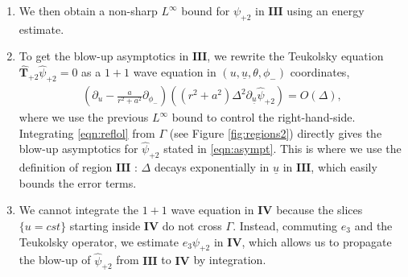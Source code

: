 \documentclass[reqno]{amsart}
\numberwithin{equation}{section}
\newcommand{\teukhat}{\widehat{\teuk}}
\newcommand{\quatre}{\mathbf{IV}}
\newcommand{\ubar}{{\underline{u}}}
\newcommand{\teuk}{\mathbf{T}}
\newcommand{\Psihat}{\widehat{\psi}}
\newcommand{\psihat}{\widehat{\psi}}
\newcommand{\trois}{\mathbf{III}}
\newcommand{\psip}{\psi_{+2}}
\newcommand{\Psihatp}{\Psihat_{+2}}
\newcommand{\psihatp}{\psihat_{+2}}
\theoremstyle{plain}
\theoremstyle{definition}
\theoremstyle{remark}
\numberwithin{equation}{section}
\begin{document}
\begin{enumerate}
    \item We then
    obtain a non-sharp $L^\infty$ bound for $\psip$ in $\trois$ using an energy estimate.
    \item\label{item:1+1} To get the blow-up asymptotics in $\trois$, we rewrite the Teukolsky equation $\teukhat_{+2}\psihatp=0$ as a $1+1$ wave equation in $(u,\ubar,\theta,\phi_-)$ coordinates, 
    \begin{align}\label{eqn:reflol}
        \left(\partial_u-\frac{a}{r^2+a^2}\partial_{\phi_-}\right)\left((r^2+a^2)\Delta^2\partial_\ubar\Psihatp\right)=O(\Delta),
    \end{align}
        where we use the previous $L^\infty$ bound to control the right-hand-side. Integrating \eqref{eqn:reflol} from $\Gamma$ (see Figure \ref{fig:regions2}) directly gives the blow-up asymptotics for $\psihatp$ stated in \eqref{eqn:asympt}. This is where we use the definition of region $\trois$ : $\Delta$ decays exponentially in $\ubar$ in $\trois$, which easily bounds the error terms. 
        \item We cannot integrate the $1+1$ wave equation in $\quatre$ because the slices $\{u=cst\}$ starting inside $\quatre$ do not cross $\Gamma$. Instead, commuting $e_3$ and the Teukolsky operator, we estimate $e_3\psip$ in $\quatre$, which allows us to propagate the blow-up of $\psihatp$ from $\trois$ to $\quatre$ by integration.
\end{enumerate}
\end{document}
